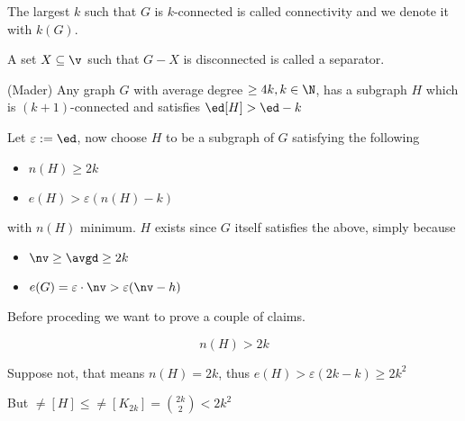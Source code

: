 The largest $k$ such that $G$ is $k$-connected is called connectivity and we denote it with $k(G)$.
\begin{definition}[Separator]
    A set $X \subseteq \v$ such that $G - X$ is disconnected is called a separator.
\end{definition}
\begin{customtheorem}{(Mader)}
    \label{theorem:mader}
    Any graph $G$ with average degree $\geq 4k, k \in \N$, has a subgraph $H$ which is $(k + 1)$-connected and satisfies $\ed[H] > \ed - k$
\end{customtheorem}
\begin{prf}
    Let $\varepsilon := \ed$, now choose $H$ to be a subgraph of $G$ satisfying the following
    \begin{itemize}
        \item $n(H) \geq 2k$
        \item $e(H) > \varepsilon(n(H) - k)$
    \end{itemize}
    with $n(H)$ minimum. $H$ exists since $G$ itself satisfies the above, simply because
    \begin{itemize}
        \item $\nv \geq \avgd \geq 2k$
        \item $e(G) = \varepsilon \cdot \nv > \varepsilon (\nv - h)$
    \end{itemize}
    Before proceding we want to prove a couple of claims.
    \begin{claim}
        \label{claim:1_Mader}
        \begin{equation*}
            n(H) > 2k
        \end{equation*}
    \end{claim}
    \begin{prf}
        Suppose not, that means $n(H) = 2k$, thus $e(H) > \varepsilon(2k - k) \geq 2k^2$

        But $\ne[H] \leq \ne[K_{2k}] = \binom{2k}{2} < 2k^2$


\end{prf}
\end{prf}
